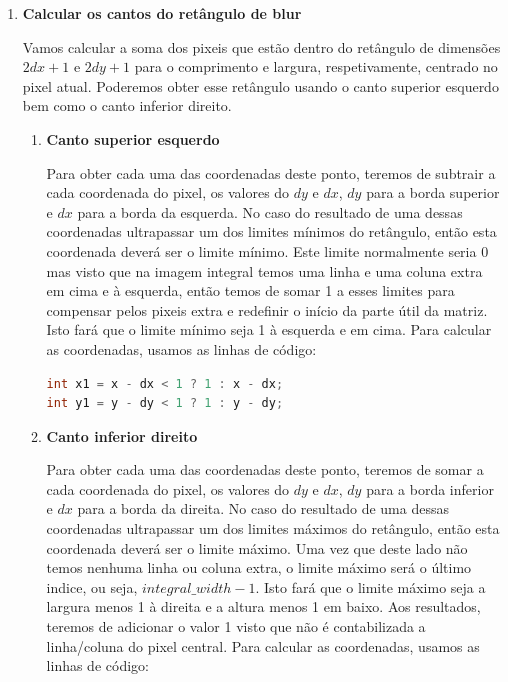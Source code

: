 \begin{enumerate}

\item {
\textbf{Calcular os cantos do retângulo de blur}

Vamos calcular a soma dos pixeis que estão dentro do retângulo de dimensões $2dx+1$ e $2dy+1$ para o comprimento e largura, respetivamente, centrado no pixel atual. Poderemos obter esse retângulo usando o canto superior esquerdo bem como o canto inferior direito.

\begin{enumerate}
    

    \item {
        \textbf{Canto superior esquerdo}

        Para obter cada uma das coordenadas deste ponto, teremos de subtrair a cada coordenada do pixel, os valores do $dy$ e $dx$, $dy$ para a borda superior e $dx$ para a borda da esquerda. No caso do resultado de uma dessas coordenadas ultrapassar um dos limites mínimos do retângulo, então esta coordenada deverá ser o limite mínimo. Este limite normalmente seria 0 mas visto que na imagem integral temos uma linha e uma coluna extra em cima e à esquerda, então temos de somar 1 a esses limites para compensar pelos pixeis extra e redefinir o início da parte útil da matriz. Isto fará que o limite mínimo seja 1 à esquerda e em cima. Para calcular as coordenadas, usamos as linhas de código: 

        \begin{lstlisting}[language=C]
int x1 = x - dx < 1 ? 1 : x - dx;
int y1 = y - dy < 1 ? 1 : y - dy;
        \end{lstlisting}
    }
    \item {
        \textbf{Canto inferior direito}

        Para obter cada uma das coordenadas deste ponto, teremos de somar a cada coordenada do pixel, os valores do $dy$ e $dx$, $dy$ para a borda inferior e $dx$ para a borda da direita. No caso do resultado de uma dessas coordenadas ultrapassar um dos limites máximos do retângulo, então esta coordenada deverá ser o limite máximo. Uma vez que deste lado não temos nenhuma linha ou coluna extra, o limite máximo será o último indice, ou seja, $integral\_width-1$. Isto fará que o limite máximo seja a largura menos 1 à direita e a altura menos 1 em baixo. Aos resultados, teremos de adicionar o valor 1 visto que não é contabilizada a linha/coluna do pixel central. Para calcular as coordenadas, usamos as linhas de código:

}
\end{enumerate}}
\end{enumerate}
